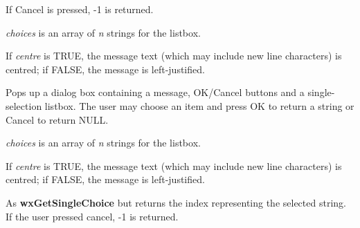 If Cancel is pressed, -1 is returned.

{\it choices} is an array of {\it n} strings for the listbox.

If {\it centre} is TRUE, the message text (which may include new line characters)
is centred; if FALSE, the message is left-justified.

\label{wxgetsinglechoice}


Pops up a dialog box containing a message, OK/Cancel buttons and a single-selection
listbox. The user may choose an item and press OK to return a string or
Cancel to return NULL.

{\it choices} is an array of {\it n} strings for the listbox.

If {\it centre} is TRUE, the message text (which may include new line characters)
is centred; if FALSE, the message is left-justified.

\label{wxgetsinglechoiceindex}


As {\bf wxGetSingleChoice} but returns the index representing the selected string.
If the user pressed cancel, -1 is returned.

\label{wxgetsinglechoicedata}


